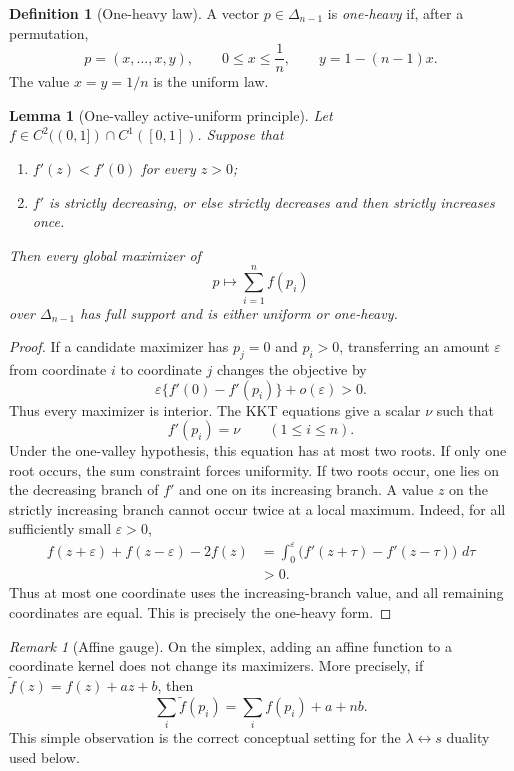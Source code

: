 \documentclass[11pt]{article}
\theoremstyle{plain}
\newtheorem{lemma}[theorem]{Lemma}
\theoremstyle{definition}
\newtheorem{definition}[theorem]{Definition}
\theoremstyle{remark}
\newtheorem{remark}[theorem]{Remark}
\newcommand{\dd}{\,d}
\newcommand{\simplex}{\Delta_{n-1}}
\begin{document}
\begin{definition}[One-heavy law]
A vector \(p\in\simplex\) is \emph{one-heavy} if, after a permutation,
\[
p=(x,\ldots,x,y),\qquad 0\le x\le\frac1n,\qquad y=1-(n-1)x.
\]
The value \(x=y=1/n\) is the uniform law.
\end{definition}

\begin{lemma}[One-valley active-uniform principle]\label{lem:one-valley}
Let \(f\in C^2((0,1])\cap C^1([0,1])\).  Suppose that
\begin{enumerate}[label=\textup{(\roman*)}]
\item \(f'(z)<f'(0)\) for every \(z>0\);
\item \(f'\) is strictly decreasing, or else strictly decreases and then strictly increases once.
\end{enumerate}
Then every global maximizer of
\[
p\longmapsto \sum_{i=1}^n f(p_i)
\]
over \(\simplex\) has full support and is either uniform or one-heavy.
\end{lemma}

\begin{proof}
If a candidate maximizer has \(p_j=0\) and \(p_i>0\), transferring an amount \(\varepsilon\) from coordinate \(i\) to coordinate \(j\) changes the objective by
\[
\varepsilon\{f'(0)-f'(p_i)\}+o(\varepsilon)>0.
\]
Thus every maximizer is interior.  The KKT equations give a scalar \(\nu\) such that
\[
f'(p_i)=\nu\qquad(1\le i\le n).
\]
Under the one-valley hypothesis, this equation has at most two roots.  If only one root occurs, the sum constraint forces uniformity.  If two roots occur, one lies on the decreasing branch of \(f'\) and one on its increasing branch.  A value \(z\) on the strictly increasing branch cannot occur twice at a local maximum.  Indeed, for all sufficiently small \(\varepsilon>0\),
\[
\begin{aligned}
f(z+\varepsilon)+f(z-\varepsilon)-2f(z)
&=\int_0^\varepsilon
\bigl(f'(z+\tau)-f'(z-\tau)\bigr)\,\dd\tau\\
&>0.
\end{aligned}
\]
Thus at most one coordinate uses the increasing-branch value, and all remaining coordinates are equal.  This is precisely the one-heavy form.
\end{proof}

\begin{remark}[Affine gauge]
On the simplex, adding an affine function to a coordinate kernel does not change its maximizers.  More precisely, if \(\widetilde f(z)=f(z)+az+b\), then
\[
\sum_i\widetilde f(p_i)=\sum_i f(p_i)+a+nb.
\]
This simple observation is the correct conceptual setting for the \(\lambda\leftrightarrow s\) duality used below.
\end{remark}
\end{document}
